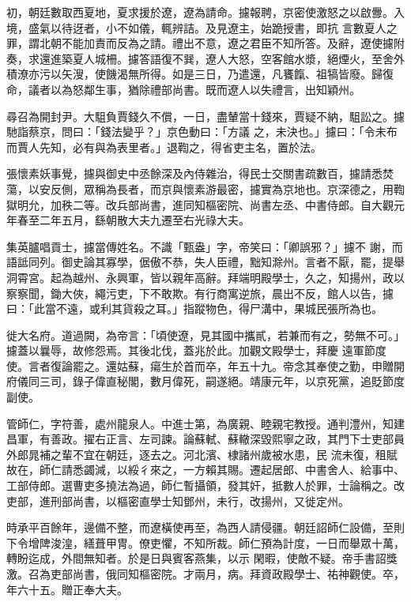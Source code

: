 \begin{pinyinscope}
 初，朝廷數取西夏地，夏求援於遼，遼為請命。攄報聘，京密使激怒之以啟釁。入境，盛氣以待迓者，小不如儀，輒辨詰。及見遼主，始跪授書，即抗
 言數夏人之罪，謂北朝不能加責而反為之請。禮出不意，遼之君臣不知所答。及辭，遼使攄附奏，求還進築夏人城柵。攄答語復不巽，遼人大怒，空客館水漿，絕煙火，至舍外積潦亦污以矢溲，使饑渴無所得。如是三日，乃遣還，凡饔餼、祖犒皆廢。歸復命，議者以為怒鄰生事，猶除禮部尚書。既而遼人以失禮言，出知穎州。



 尋召為開封尹。大駔負賈錢久不償，一日，盡輦當十錢來，賈疑不納，駔訟之。攄馳詣蔡京，問曰：「錢法變乎？」京色動曰：「方議
 之，未決也。」攄曰：「令未布而賈人先知，必有與為表里者。」退鞫之，得省吏主名，置於法。



 張懷素妖事覺，攄與御史中丞餘深及內侍雜治，得民士交關書疏數百，攄請悉焚蕩，以安反側，眾稱為長者，而京與懷素游最密，攄實為京地也。京深德之，用鞫獄明允，加秩二等。改兵部尚書，進同知樞密院、尚書左丞、中書侍郎。自大觀元年春至二年五月，繇朝散大夫九遷至右光祿大夫。



 集英臚唱貢士，攄當傳姓名。不識「甄盎」字，帝笑曰：「卿誤邪？」攄不
 謝，而語詆同列。御史論其寡學，倨傲不恭，失人臣禮，黜知滁州。言者不厭，罷，提舉洞霄宮。起為越州、永興軍，皆以親年高辭。拜端明殿學士，久之，知揚州，政以察察聞，鋤大俠，繩污吏，下不敢欺。有行商寓逆旅，晨出不反，館人以告，攄曰：「此當不遠，或利其貨殺之耳。」指蹤物色，得尸溝中，果城民張所為也。



 徙大名府。道過闕，為帝言：「頃使遼，見其國中攜貳，若兼而有之，勢無不可。」攄蓋以曩辱，故修怨焉。其後北伐，蓋兆於此。加觀文殿學士，拜慶
 遠軍節度使。言者復論罷之。還姑蘇，瘍生於首而卒，年五十九。帝念其奉使之勤，申贈開府儀同三司，錄子偉直秘閣，數月偉死，嗣遂絕。靖康元年，以京死黨，追貶節度副使。



 管師仁，字符善，處州龍泉人。中進士第，為廣親、睦親宅教授。通判澧州，知建昌軍，有善政。擢右正言、左司諫。論蘇軾、蘇轍深毀熙寧之政，其門下士吏部員外郎晁補之輩不宜在朝廷，逐去之。河北濱、棣諸州歲被水患，民
 流未復，租賦故在，師仁請悉蠲減，以綏彳來之，一方賴其賜。遷起居郎、中書舍人、給事中、工部侍郎。選曹吏多撓法為過，師仁暫攝領，發其奸，抵數人於罪，士論稱之。改吏部，進刑部尚書，以樞密直學士知鄧州，未行，改揚州，又徙定州。



 時承平百餘年，邊備不整，而遼橫使再至，為西人請侵疆。朝廷詔師仁設備，至則下令增陴浚湟，繕葺甲冑。僚吏懼，不知所裁。師仁預為計度，一日而舉眾十萬，轉盼迄成，外間無知者。於是日與賓客燕集，以示
 閑暇，使敵不疑。帝手書詔獎激。召為吏部尚書，俄同知樞密院。才兩月，病。拜資政殿學士、祐神觀使。卒，年六十五。贈正奉大夫。




\end{pinyinscope}
